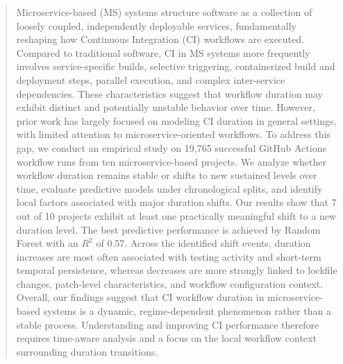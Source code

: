 \documentclass[conference]{IEEEconf}
\begin{document}
\begin{abstract}

Microservice-based (MS) systems structure software as a collection of loosely coupled, independently deployable services, fundamentally reshaping how Continuous Integration (CI) workflows are executed. Compared to traditional software, CI in MS systems more frequently involves service-specific builds, selective triggering, containerized build and deployment steps, parallel execution, and complex inter-service dependencies. These characteristics suggest that workflow duration may exhibit distinct and potentially unstable behavior over time. However, prior work has largely focused on modeling CI duration in general settings, with limited attention to microservice-oriented workflows. 
To address this gap, we conduct an empirical study on 19,765 successful GitHub Actions workflow runs from ten microservice-based projects. We analyze whether workflow duration remains stable or shifts to new sustained levels over time, evaluate predictive models under chronological splits, and identify local factors associated with major duration shifts.
Our results show that 7 out of 10 projects exhibit at least one practically meaningful shift to a new duration level. The best predictive performance is achieved by Random Forest with an $R^2$ of 0.57. Across the identified shift events, duration increases are most often associated with testing activity and short-term temporal persistence, whereas decreases are more strongly linked to lockfile changes, patch-level characteristics, and workflow configuration context. 
Overall, our findings suggest that CI workflow duration in microservice-based systems is a dynamic, regime-dependent phenomenon rather than a stable process. Understanding and improving CI performance therefore requires time-aware analysis and a focus on the local workflow context surrounding duration transitions.



\end{abstract}
\end{document}

